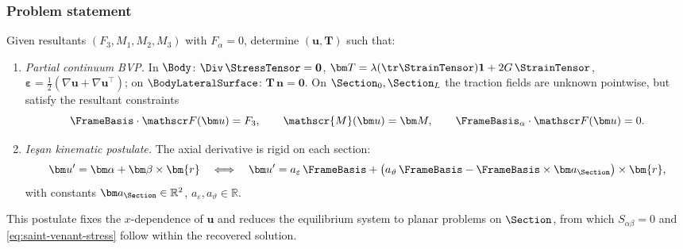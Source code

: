 \subsubsection*{Problem statement}
Given resultants \((F_3,M_1,M_2,M_3)\) with \(F_\alpha=0\), determine \((\bm u,\bm T)\) such that:
\begin{enumerate}
  \item \textit{Partial continuum BVP.} In \(\Body\): \(\Div\,\StressTensor = \mathbf{0}\), \(\bm T=\lambda (\tr\StrainTensor) \mathbf{1} + 2G\,\StrainTensor\),
        \(\bm\varepsilon=\tfrac12(\nabla\bm u+\nabla\bm u^{\!\top})\); on \(\BodyLateralSurface\): \(\bm T\,\bm n=\mathbf{0}\).
        On \(\Section_0,\Section_L\) the traction fields are unknown pointwise, but satisfy the resultant constraints
        \[
        \FrameBasis\cdot\mathscr F(\bm u)=F_3,\qquad \mathscr{M}(\bm u)=\bm M,\qquad \FrameBasis_\alpha\cdot\mathscr F(\bm u)=0 .
        \]
  \item \textit{Ie\c{s}an kinematic postulate.} The axial derivative is rigid on each section:
        \begin{equation}
        \bm u'=\bm\alpha+\bm\beta\times\bm{r}
        \quad\Longleftrightarrow\quad
        \bm u'= a_{\varepsilon}\,\FrameBasis + \big(a_{\vartheta}\,\FrameBasis-\FrameBasis\times\bm a_\Section\big)\times\bm{r} ,
        \label{eq:Iesan-postulate-1}
        \end{equation}
        with constants \(\bm a_\Section\in\mathbb{R}^2\), \(a_\varepsilon,a_\vartheta\in\mathbb{R}\).
\end{enumerate}
This postulate fixes the \(x\)-dependence of \(\bm u\) and reduces the equilibrium system to planar problems on \(\Section\), from which \(S_{\alpha\beta}=0\) and \eqref{eq:saint-venant-stress} follow within the recovered solution.

